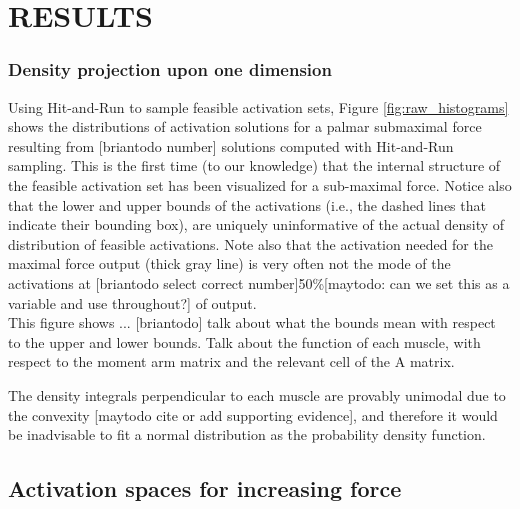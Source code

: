 

\section{RESULTS}
\subsubsection{Density projection upon one dimension} %
\label{ssub:density_projection_upon_one_dimension}

Using Hit-and-Run to sample feasible activation sets, Figure \ref{fig:raw_histograms} shows the distributions of activation solutions for a palmar submaximal force resulting from [briantodo number] solutions computed with Hit-and-Run sampling. This is the first time (to our knowledge) that the internal structure of the feasible activation set has been visualized for a sub-maximal force.
Notice also that the lower and upper bounds of the activations (i.e., the dashed lines that indicate their bounding box), are uniquely uninformative of the actual density of distribution of feasible activations. Note also that the activation needed for the maximal force output (thick gray line) is very often not the mode of the activations at [briantodo select correct number]50\%[maytodo: can we set this as a variable and use throughout?] of output.
\\
This figure shows ... [briantodo]
talk about what the bounds mean with respect to the upper and lower bounds.
Talk about the function of each muscle, with respect to the moment arm matrix and the relevant cell of the A matrix.

The density integrals perpendicular to each muscle are provably unimodal due to the convexity [maytodo cite or add supporting evidence], and therefore it would be inadvisable to fit a normal distribution as the probability density function.


\subsection{Activation spaces for increasing force} %
\label{sub:activation_spaces_for_increasing_force}

